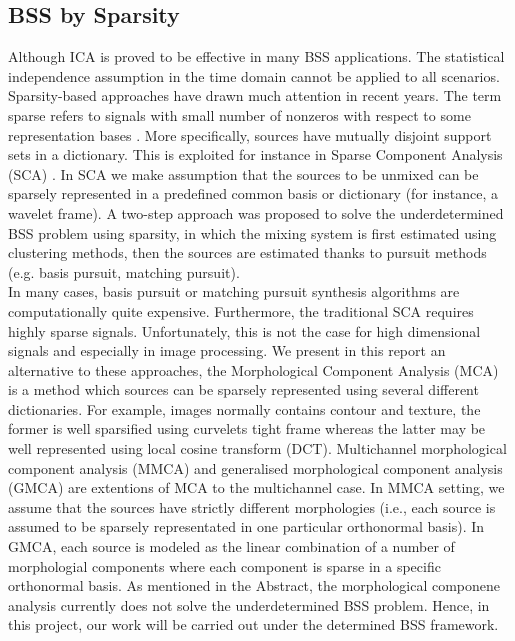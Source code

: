 \subsection{BSS by Sparsity}
Although ICA is proved to be effective in many BSS applications. The statistical independence assumption in the time domain cannot be applied to all scenarios. Sparsity-based approaches have drawn much attention in recent years. The term sparse refers to signals with small number of nonzeros with respect to some representation bases \cite{ZibulevskyMichael2001BSSb}. More specifically, sources have mutually disjoint support sets in a dictionary. This is exploited for instance in Sparse Component Analysis (SCA) \cite{SCA2005}. In SCA we make assumption that the sources to be unmixed can be sparsely represented in a predefined common basis or dictionary (for instance, a wavelet frame). A two-step approach \cite{BOFILL20012353} was proposed  to solve the underdetermined BSS problem using sparsity, in which the mixing system is first estimated using clustering methods, then the sources are estimated thanks to pursuit methods (e.g. basis pursuit, matching pursuit).\\

In many cases, basis pursuit or matching pursuit synthesis algorithms are computationally quite expensive. Furthermore, the traditional SCA requires highly sparse signals. Unfortunately, this is not the case for high dimensional signals and especially in image processing. We present in this report an alternative to these approaches, the Morphological Component Analysis (MCA) \cite{BobinJ_2007SaMD, BobinJ_2006Mdas} is a method which sources can be sparsely represented using several different dictionaries. For example, images normally contains contour and texture, the former is well sparsified using curvelets tight frame whereas the latter may be well represented using local cosine transform (DCT). 
Multichannel morphological component analysis (MMCA) \cite{Starck2005MorphologicalCA} and generalised morphological component analysis (GMCA) are extentions of MCA to the multichannel case. In MMCA setting, we assume that the sources have strictly different morphologies (i.e., each source is assumed to be sparsely representated in one particular orthonormal basis). In GMCA, each source is modeled as the linear combination of a number of morphologial components where each component is sparse in a specific orthonormal basis. As mentioned in the Abstract, the morphological componene analysis currently does not solve the underdetermined BSS problem. Hence, in this project, our work will be carried out under the determined BSS framework.

